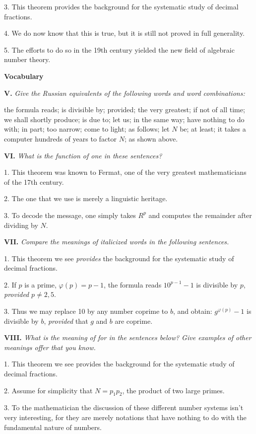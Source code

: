 \documentclass[a4paper]{article}
\newcommand{\ESect}[1]{\medskip\par{\large \textbf{#1}}\par}
\newcommand{\ETask}[2]{\medskip\par\textbf{#1.} \textit{#2}\par}
\begin{document}
3. This theorem provides the background for the systematic study of decimal fractions.

4. We do now know that this is true, but it is still not proved in full generality.

5. The efforts to do so in the 19th century yielded the new field of algebraic number theory.

\ESect{Vocabulary}
\ETask{V}{Give the Russian equivalents of the following words and word combinations:}
the formula reads; is divisible by; provided; the very greatest; if not of all time; we shall shortly produce; is due to;
let us; in the same way; have nothing to do with; in part; too narrow; come to light; as follows; let $N$ be; at least; it
takes a computer hundreds of years to factor $N$; as shown above.

\ETask{VI}{What is the function of one in these sentences?}
1. This theorem was known to Fermat, one of the very greatest mathematicians of the 17th century.

2. The one that we use is merely a linguistic heritage.

3. To decode the message, one simply takes $R^p$ and computes the remainder after dividing by $N$.

\ETask{VII}{Compare the meanings of italicized words in the following sentences.}

1. This theorem we see \textit{provides} the background for the systematic study of decimal fractions.

2. If $p$ is a prime, $\varphi(p)=p-1$, the formula reads $10^{p-1}-1$ is divisible by $p$, \textit{provided} $p \neq 2,5$.

3. Thus we may replace 10 by any number coprime to $b$, and obtain: $g^{\varphi(p)}-1$ is divisible by $b$, \textit{provided} that
$g$ and $b$ are coprime.

\ETask{VIII}{What is the meaning of for in the sentences below? Give examples of other meanings offer that you know.}
1. This theorem we see provides the background for the systematic study of decimal fractions.

2. Assume for simplicity that $N = p_1p_2$, the product of two large primes.

3. To the mathematician the discussion of these different number systems isn't very interesting, for they are merely
notations that have nothing to do with the fundamental nature of numbers.
\end{document}
